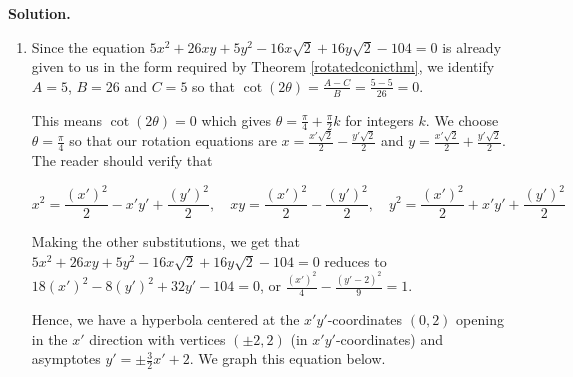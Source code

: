\documentclass{ximera}
\begin{document}
{\begin{example}
{\bf Solution.}  

\begin{enumerate}

\item Since the equation $5x^2+26xy+5y^2-16x\sqrt{2}+16y\sqrt{2}-104 = 0$ is already given to us in the form required by Theorem \ref{rotatedconicthm}, we identify $A = 5$, $B = 26$ and $C = 5$ so that $\cot(2\theta) = \frac{A-C}{B} = \frac{5-5}{26} = 0$.  

\smallskip

This means $\cot(2\theta) = 0$ which gives $\theta = \frac{\pi}{4} + \frac{\pi}{2} k$ for integers $k$.  We choose $\theta = \frac{\pi}{4}$ so that our rotation equations are $x = \frac{x' \sqrt{2}}{2} -\frac{y' \sqrt{2}}{2}$ and $y = \frac{x' \sqrt{2}}{2} + \frac{y' \sqrt{2}}{2}$.  The reader should verify that 

\vspace{-.1in}

\[ x^2 = \frac{(x')^2}{2} - x'y' +\frac{(y')^2}{2}, \quad xy = \frac{(x')^2}{2} -\frac{(y')^2}{2}, \quad y^2 = \frac{(x')^2}{2} + x'y' +\frac{(y')^2}{2} \]

Making the other substitutions, we get that $5x^2+26xy+5y^2-16x\sqrt{2}+16y\sqrt{2}-104 = 0$ reduces to $18(x')^2-8(y')^2+32y'-104 = 0$, or $\frac{(x')^2}{4} -\frac{(y'-2)^2}{9} = 1$.  

\smallskip

Hence, we have a hyperbola centered at the $x'y'$-coordinates $(0,2)$ opening in the $x'$ direction with vertices $(\pm 2,2)$ (in $x'y'$-coordinates)  and asymptotes $y' = \pm \frac{3}{2} x' + 2$. We graph this equation below. 

\begin{center}


\end{center}
\end{enumerate}
\end{example}}
\end{document}
